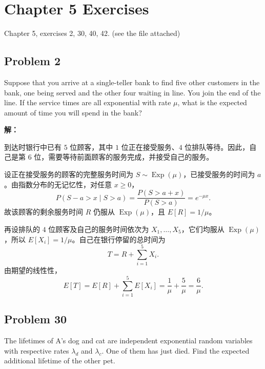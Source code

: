 \documentclass[12pt,a4paper]{article}
\begin{document}
\section{Chapter 5 Exercises}

Chapter 5, exercises 2, 30, 40, 42. (see the file attached)

\subsection{Problem 2}

Suppose that you arrive at a single-teller bank to find five other customers in the bank, one being served and the other four waiting in line. You join the end of the line. If the service times are all exponential with rate $\mu$, what is the expected amount of time you will spend in the bank?

\begin{answerbox}
\textbf{解：}

到达时银行中已有 $5$ 位顾客，其中 $1$ 位正在接受服务、$4$ 位排队等待。因此，自己是第 $6$ 位，需要等待前面顾客的服务完成，并接受自己的服务。

设正在接受服务的顾客的完整服务时间为 $S\sim\operatorname{Exp}(\mu)$，已接受服务的时间为 $a$。由指数分布的无记忆性，对任意 $x\geq0$，
$$
P(S-a>x\mid S>a)
=\frac{P(S>a+x)}{P(S>a)}
=e^{-\mu x}.
$$
故该顾客的剩余服务时间 $R$ 仍服从 $\operatorname{Exp}(\mu)$，且 $E[R]=1/\mu$。

再设排队的 $4$ 位顾客及自己的服务时间依次为 $X_1,\ldots,X_5$，它们均服从 $\operatorname{Exp}(\mu)$，所以 $E[X_i]=1/\mu$。自己在银行停留的总时间为
$$
T=R+\sum_{i=1}^{5}X_i.
$$
由期望的线性性，
$$
E[T]=E[R]+\sum_{i=1}^{5}E[X_i]
=\frac{1}{\mu}+\frac{5}{\mu}=\frac{6}{\mu}.
$$
\end{answerbox}

\subsection{Problem 30}

The lifetimes of A's dog and cat are independent exponential random variables with respective rates $\lambda_d$ and $\lambda_c$. One of them has just died. Find the expected additional lifetime of the other pet.
\end{document}

